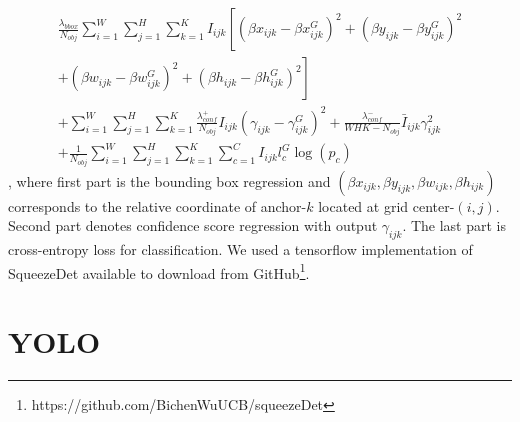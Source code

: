 \documentclass[twoside]{ctuthesis}
\theoremstyle{plain}
\theoremstyle{definition}
\theoremstyle{note}
\begin{document}
\begin{multline}
\frac{\lambda_{bbox}}{N_{obj}}\sum_{i=1}^W\sum_{j=1}^H\sum_{k=1}^KI_{ijk}\left[\left(\beta x_{ijk}-\beta x_{ijk}^G\right)^2+\left(\beta y_{ijk} - \beta y_{ijk}^G\right)^2\right. \\
+\left(\beta w_{ijk}-\beta w_{ijk}^G\right)^2 + \left(\beta h_{ijk}-\beta h_{ijk}^G\right)^2\left. \right]\\
+\sum_{i=1}^W\sum_{j=1}^H\sum_{k=1}^K\frac{\lambda^{+}_{conf}}{N_{obj}}I_{ijk}\left(\gamma_{ijk}-\gamma_{ijk}^G\right)^2 + \frac{\lambda^{-}_{conf}}{WHK-N_{obj}}\bar{I}_{ijk}\gamma^2_{ijk}\\
+\frac{1}{N_{obj}}\sum_{i=1}^W\sum_{j=1}^H\sum_{k=1}^K\sum_{c=1}^CI_{ijk}l_c^G\log(p_c)
\end{multline},
where first part is the bounding box regression and $\left(\beta x_{ijk}, \beta y_{ijk}, \beta w_{ijk}, \beta h_{ijk}\right)$ corresponds to the relative coordinate of anchor-$k$ located at grid center-$(i,j)$. Second part denotes confidence score regression with output $\gamma_{ijk}$. The last part is cross-entropy   loss for classification.
We used a tensorflow implementation of SqueezeDet available to download from GitHub\footnote{https://github.com/BichenWuUCB/squeezeDet}.
\section{YOLO}
\end{document}
